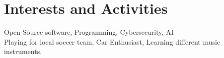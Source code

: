 \documentclass[a4paper,10pt]{article} %
\begin{document}

\section{Interests and Activities}

Open-Source software, Programming, Cybersecurity, AI\\
Playing for local soccer team, Car Enthusiast, Learning different music instruments.





\end{document}
